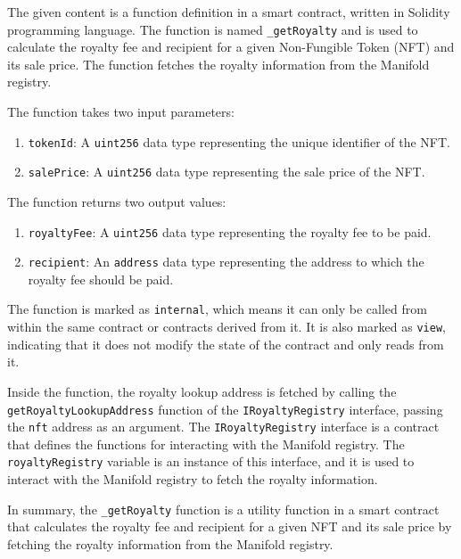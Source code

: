The given content is a function definition in a smart contract, written
in Solidity programming language. The function is named
\texttt{\_getRoyalty} and is used to calculate the royalty fee and
recipient for a given Non-Fungible Token (NFT) and its sale price. The
function fetches the royalty information from the Manifold registry.

The function takes two input parameters:

\begin{enumerate}
\def\labelenumi{\arabic{enumi}.}
\tightlist
\item
  \texttt{tokenId}: A \texttt{uint256} data type representing the unique
  identifier of the NFT.
\item
  \texttt{salePrice}: A \texttt{uint256} data type representing the sale
  price of the NFT.
\end{enumerate}

The function returns two output values:

\begin{enumerate}
\def\labelenumi{\arabic{enumi}.}
\tightlist
\item
  \texttt{royaltyFee}: A \texttt{uint256} data type representing the
  royalty fee to be paid.
\item
  \texttt{recipient}: An \texttt{address} data type representing the
  address to which the royalty fee should be paid.
\end{enumerate}

The function is marked as \texttt{internal}, which means it can only be
called from within the same contract or contracts derived from it. It is
also marked as \texttt{view}, indicating that it does not modify the
state of the contract and only reads from it.

Inside the function, the royalty lookup address is fetched by calling
the \texttt{getRoyaltyLookupAddress} function of the
\texttt{IRoyaltyRegistry} interface, passing the \texttt{nft} address as
an argument. The \texttt{IRoyaltyRegistry} interface is a contract that
defines the functions for interacting with the Manifold registry. The
\texttt{royaltyRegistry} variable is an instance of this interface, and
it is used to interact with the Manifold registry to fetch the royalty
information.

In summary, the \texttt{\_getRoyalty} function is a utility function in
a smart contract that calculates the royalty fee and recipient for a
given NFT and its sale price by fetching the royalty information from
the Manifold registry.

